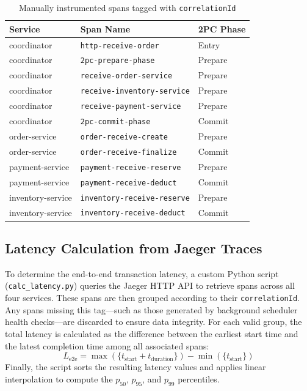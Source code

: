 \documentclass[]{USG}
\begin{document}
\begin{table}[!ht]
  \caption{Manually instrumented spans tagged with \texttt{correlationId}}
  \label{tab:spans}
  \centering
  \begin{tabular}{lll}
    \toprule
    \textbf{Service} & \textbf{Span Name} & \textbf{2PC Phase} \\
    \midrule
    coordinator       & \texttt{http-receive-order}         & Entry \\
    coordinator       & \texttt{2pc-prepare-phase}          & Prepare \\
    coordinator       & \texttt{receive-order-service}      & Prepare \\
    coordinator       & \texttt{receive-inventory-service}  & Prepare \\
    coordinator       & \texttt{receive-payment-service}    & Prepare \\
    coordinator       & \texttt{2pc-commit-phase}           & Commit \\
    order-service     & \texttt{order-receive-create}       & Prepare \\
    order-service     & \texttt{order-receive-finalize}     & Commit \\
    payment-service   & \texttt{payment-receive-reserve}    & Prepare \\
    payment-service   & \texttt{payment-receive-deduct}     & Commit \\
    inventory-service & \texttt{inventory-receive-reserve}  & Prepare \\
    inventory-service & \texttt{inventory-receive-deduct}   & Commit \\
    \bottomrule
  \end{tabular}
\end{table}

\subsection{Latency Calculation from Jaeger Traces}
\label{subsec:latency-calc}

To determine the end-to-end transaction latency, a custom Python script 
(\texttt{calc\_latency.py}) queries the Jaeger HTTP API to retrieve spans 
across all four services.
%
These spans are then grouped according to their \texttt{correlationId}.
%
Any spans missing this tag---such as those generated by background scheduler 
health checks---are discarded to ensure data integrity.
%
For each valid group, the total latency is calculated as the difference between 
the earliest start time and the latest completion time among all associated spans:
%
\begin{equation}
  L_{\text{e2e}} = \max(\{t_{\text{start}} + t_{\text{duration}}\}) - \min(\{t_{\text{start}}\})
  \label{eq:latency}
\end{equation}
%
Finally, the script sorts the resulting latency values and applies linear 
interpolation to compute the $p_{50}$, $p_{95}$, and $p_{99}$ percentiles.
\end{document}
